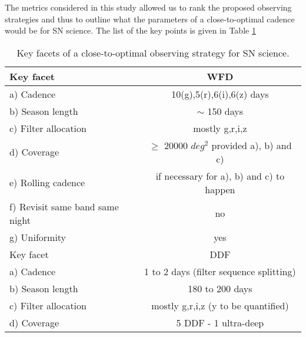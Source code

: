  The metrics considered in this study allowed us to rank the proposed observing strategies and thus to outline what the parameters of a close-to-optimal cadence would be for SN science. The list of the key points is given in Table \ref{tab:optimal_strategy}

\begin{table}[!htbp]
  \begin{center}
    \caption{Key facets of a close-to-optimal observing strategy for SN science.}\label{tab:optimal_strategy}
\begin{tabular}{l|c}
  \hline
  \hline
 Key facet & WFD \\
 \hline
a) Cadence                      & 10(g),5(r),6(i),6(z) days \\
b) Season length                & $\sim$ 150 days               \\
c) Filter allocation            & mostly g,r,i,z            \\
d) Coverage                     & $\geq$ 20000 $deg^2$ provided a), b) and c) \\
e) Rolling cadence              & if necessary for a), b) and c) to happen \\
f) Revisit same band same night & no \\
g) Uniformity                   & yes \\
\hline
 \hline
 Key facet & DDF \\
 \hline
a) Cadence                      & 1 to 2 days (filter sequence splitting) \\
b) Season length                & 180 to 200 days \\
c) Filter allocation            & mostly g,r,i,z (y to be quantified) \\
d) Coverage                     & 5 DDF - 1 ultra-deep \\
\hline
 \end{tabular}
\end{center}
\end{table}


